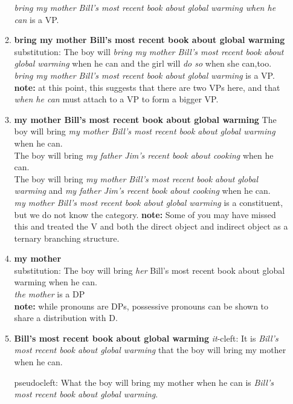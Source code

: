 \documentclass[a4paper,12pt]{article}
\begin{document}
\begin{enumerate}
\begin{enumerate}
         \textit{bring my mother Bill's most recent book about global warming when he can} is a VP.

      \item \textbf{bring my mother Bill's most recent book about global warming}\\
      substitution: The boy will \textit{bring my mother Bill's most recent book about global warming} when he can and the girl will \textit{do so} when she can,too.\\  \textit{bring my mother Bill's most recent book about global warming} is a VP.\\
      \textbf{note:} at this point, this suggests that there are two VPs here, and that \textit{when he can} must attach to a VP to form a bigger VP.

      \item \textbf{my mother Bill's most recent book about global warming}
      The boy will bring \textit{my mother Bill's most recent book about global warming} when he can.\\
      The boy will bring \textit{my father Jim's recent book about cooking} when he can.\\
      The boy will bring \textit{my mother Bill's most recent book about global warming} and \textit{my father Jim's recent book about cooking} when he can.\\
      \textit{my mother Bill's most recent book about global warming} is a constituent, but we do not know the category.
      \textbf{note:} Some of you may have missed this and treated the V and both the direct object and indirect object as a ternary branching structure.

      \item \textbf{my mother}\\
      substitution: The boy will bring \textit{her} Bill's most recent book about global warming when he can.\\
      \textit{the mother} is a DP\\
      \textbf{note:} while pronouns are DPs, possessive pronouns can be shown to share a distribution with D.

      \item\textbf{Bill's most recent book about global warming}
      \textit{it}-cleft: It is \textit{Bill's most recent book about global warming} that the boy will bring my mother when he can.

      pseudocleft: What the boy will bring my mother when he can  is \textit{Bill's most recent book about global warming}.


\end{enumerate}
\end{enumerate}
\end{document}
